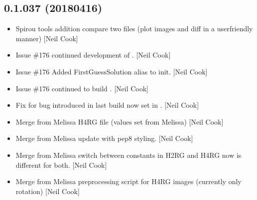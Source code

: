 \documentclass[a4paper,10pt,english]{report}
\begin{document}
\subsection{0.1.037 (2018\sphinxhyphen{}04\sphinxhyphen{}16)}
\label{\detokenize{misc/changelog:id480}}\begin{itemize}
\item {} 
Spirou tools addition \sphinxhyphen{} compare two files (plot images and diff in a
user\sphinxhyphen{}friendly manner) {[}Neil Cook{]}

\item {} 
Issue \#176 \sphinxhyphen{} continued development of . {[}Neil Cook{]}

\item {} 
Issue \#176 \sphinxhyphen{} Added FirstGuessSolution alias to init. {[}Neil Cook{]}

\item {} 
Issue \#176 \sphinxhyphen{} continued to build . {[}Neil Cook{]}

\item {} 
Fix for bug introduced in last build \sphinxhyphen{}  now set in
. {[}Neil Cook{]}

\item {} 
Merge from Melissa \sphinxhyphen{} H4RG  file (values set from
Melissa) {[}Neil Cook{]}

\item {} 
Merge from Melissa \sphinxhyphen{} update  with pep8 styling.
{[}Neil Cook{]}

\item {} 
Merge from Melissa \sphinxhyphen{} switch between constants in H2RG and H4RG now
 is different for both. {[}Neil Cook{]}

\item {} 
Merge from Melissa \sphinxhyphen{} pre\sphinxhyphen{}processing script for H4RG images (currently
only rotation) {[}Neil Cook{]}

\end{itemize}
\end{document}
